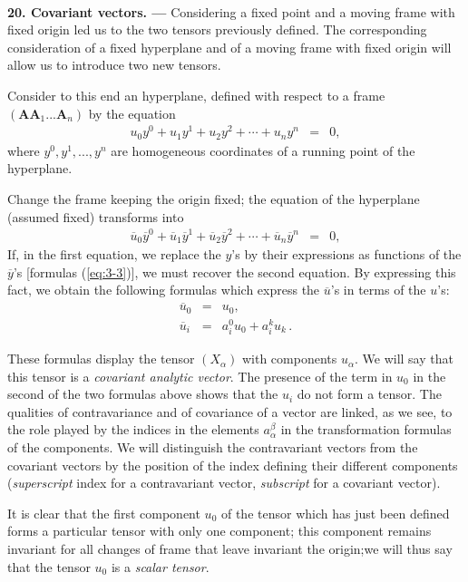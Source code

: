 
\ \\

{\bf 20. Covariant vectors. --- }
% 
Considering a fixed point and a moving frame with fixed origin led us to the two tensors previously defined. The corresponding consideration of a fixed hyperplane and of a moving frame with fixed origin will allow us to introduce two new tensors. 

Consider to this end an hyperplane, defined with respect to a frame $(\bm A \bm A_1 ... \bm A_n)$ by the equation
\begin{eqnarray*}
u_0 y^0 + u_1 y^1 + u_2 y^2 + \cdots + u_n y^n &=& 0, 
\end{eqnarray*}
where $y^0, y^1, ..., y^n$ are homogeneous coordinates of a running point of the hyperplane. 

Change the frame keeping the origin fixed; the equation of the hyperplane (assumed fixed) transforms into 
\begin{eqnarray*}
\overline u_0 \overline y^0 + \overline u_1 \overline y^1 + \overline u_2 \overline y^2 + \cdots + \overline u_n \overline y^n &=& 0, 
\end{eqnarray*}
If, in the first equation, we replace the $y$'s by their expressions as functions of the $\overline y$'s [formulas (\ref{eq:3-3})], we must recover the second equation. By expressing this fact, we obtain the following formulas which express the $\overline u$'s in terms of the $u$'s:
\begin{eqnarray*}
\overline u_0 &=& u_0, \\
\overline u_i &=& a^0_i u_0 + a^k_i u_k\, .
\end{eqnarray*}

These formulas display the tensor $(X_\alpha)$ with components $u_\alpha$. We will say that this tensor is a {\em covariant analytic vector}. The presence of the term in $u_0$ in the second of the two formulas above shows that the $u_i$ do not form a tensor. The qualities of contravariance and of covariance of a vector are linked, as we see, to the role played by the indices in the elements $a^\beta_\alpha$ in the transformation formulas of the components.  We will distinguish the contravariant vectors from the covariant vectors by the position of the index defining their different components ({\em superscript} index for a contravariant vector, {\em subscript} for a covariant vector).

It is clear that the first component $u_0$ of the tensor which has just been defined forms a particular tensor with only one component; this component remains invariant for all changes of frame that leave invariant the origin;we will thus say that the tensor $u_0$ is a {\em scalar tensor}. 

